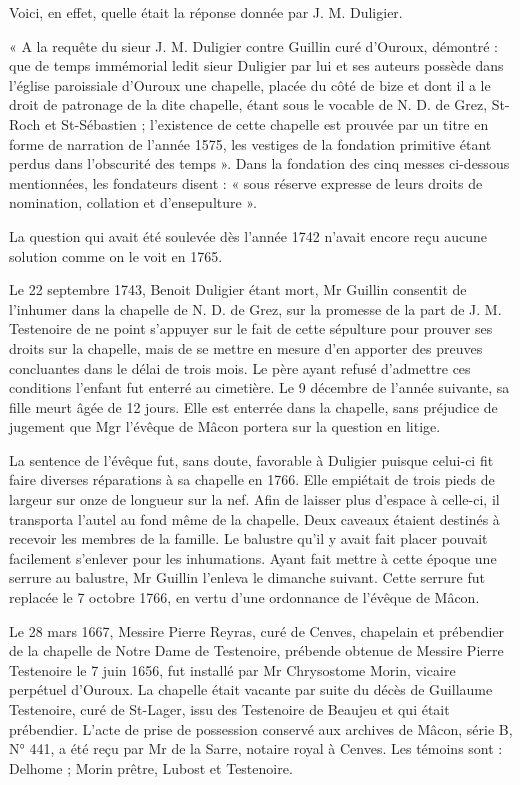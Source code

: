 Voici, en effet, quelle était la réponse donnée par J. M. Duligier.

« A la requête du sieur J. M. Duligier contre Guillin curé d'Ouroux, démontré : que de temps immémorial ledit sieur Duligier par lui et ses auteurs possède dans l'église paroissiale d'Ouroux une chapelle, placée du côté de bize et dont il a le droit de patronage de la dite chapelle, étant sous le vocable de N. D. de Grez, St-Roch et St-Sébastien ; l'existence de cette chapelle est prouvée par un titre en forme de narration de l'année 1575, les vestiges de la fondation primitive étant perdus dans l'obscurité des temps ». Dans la fondation des cinq messes ci-dessous mentionnées, les fondateurs disent : « sous réserve expresse de leurs droits de nomination, collation et d'ensepulture ».

La question qui avait été soulevée dès l'année 1742 n'avait encore reçu aucune solution comme on le voit en 1765.

Le 22 septembre 1743, Benoit Duligier étant mort, Mr Guillin consentit de l'inhumer dans la chapelle de N. D. de Grez, sur la promesse de la part de J. M. Testenoire de ne point s'appuyer sur le fait de cette sépulture pour prouver ses droits sur la chapelle, mais de se mettre en mesure d'en apporter des preuves concluantes dans le délai de trois mois. Le père ayant refusé d'admettre ces conditions l'enfant fut enterré au cimetière. Le 9 décembre de l'année suivante, sa fille meurt âgée de 12 jours. Elle est enterrée dans la chapelle, sans préjudice de jugement que Mgr l'évêque de Mâcon portera sur la question en litige.

La sentence de l'évêque fut, sans doute, favorable à Duligier puisque celui-ci fit faire diverses réparations à sa chapelle en 1766. Elle empiétait de trois pieds de largeur sur onze de longueur sur la nef. Afin de laisser plus d'espace à celle-ci, il transporta l'autel au fond même de la chapelle. Deux caveaux étaient destinés à recevoir les membres de la famille. Le balustre qu'il y avait fait placer pouvait facilement s'enlever pour les inhumations. Ayant fait mettre à cette époque une serrure au balustre, Mr Guillin l'enleva le dimanche suivant. Cette serrure fut replacée le 7 octobre 1766, en vertu d'une ordonnance de l'évêque de Mâcon.

Le 28 mars 1667, Messire Pierre Reyras, curé de Cenves, chapelain et prébendier de la chapelle de Notre Dame de Testenoire, prébende obtenue de Messire Pierre Testenoire le 7 juin 1656, fut installé par Mr Chrysostome Morin, vicaire perpétuel d'Ouroux. La chapelle était vacante par suite du décès de Guillaume Testenoire, curé de St-Lager, issu des Testenoire de Beaujeu et qui était prébendier. L'acte de prise de possession conservé aux archives de Mâcon, série B, N° 441, a été reçu par Mr de la Sarre, notaire royal à Cenves. Les témoins sont : Delhome ; Morin prêtre, Lubost et Testenoire.

